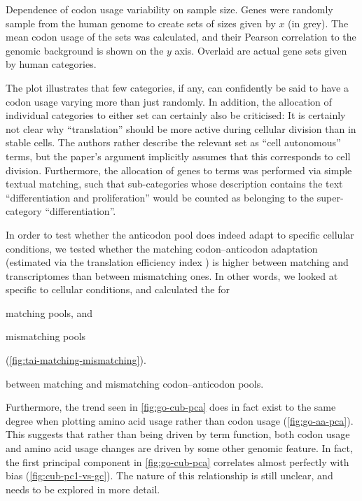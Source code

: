     {Dependence of codon usage variability on sample size.}
    {Genes were randomly sample from the human genome to create sets of sizes
    given by \(x\) (in grey). The mean codon usage of the sets was calculated,
    and their Pearson correlation to the genomic background is shown on the
    \(y\) axis. Overlaid are actual gene sets given by human \go categories.}

The plot illustrates that few \go categories, if any, can confidently be said to
have a codon usage varying more than just randomly. In addition, the allocation
of individual \go categories to either set can certainly also be criticised: It
is certainly not clear why “translation” should be more active during cellular
division than in stable cells. The authors rather describe the relevant set as
“cell autonomous” \go terms, but the paper’s argument implicitly assumes that
this corresponds to cell division. Furthermore, the allocation of genes to \go
terms was performed via simple textual matching, such that \go sub-categories
whose description contains the text “differentiation and proliferation” would be
counted as belonging to the \go super-category “differentiation”.

In order to test whether the anticodon pool does indeed adapt to specific
cellular conditions, we tested whether the matching codon--anticodon adaptation
(estimated via the translation efficiency index \tai) is higher between matching
\mrna and \trna transcriptomes than between mismatching ones. In other words, we
looked at \mrna specific to cellular conditions, and calculated the \tai[s] for
\begin{enumerate*}
    \item matching \trna pools, and
    \item mismatching \trna pools
\end{enumerate*}
(\cref{fig:tai-matching-mismatching}).

    {\tai between matching and mismatching codon--anticodon pools.}
    {}


Furthermore, the trend seen in \cref{fig:go-cub-pca} does in fact exist to the
same degree when plotting amino acid usage rather than codon usage
(\cref{fig:go-aa-pca}). This suggests that rather than being driven by \go term
function, both codon usage and amino acid usage changes are driven by some other
genomic feature. In fact, the first principal component in \cref{fig:go-cub-pca}
correlates almost perfectly with \gc bias (\cref{fig:cub-pc1-vs-gc}). The nature
of this relationship is still unclear, and needs to be explored in more detail.

